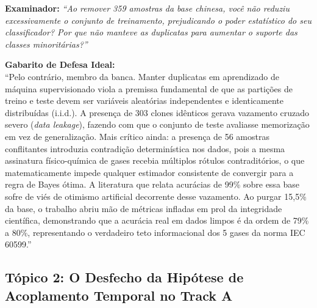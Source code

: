 \documentclass[10pt,a4paper]{article}
\begin{document}
\begin{alertbox}
\textbf{Examinador:} \textit{``Ao remover 359 amostras da base chinesa, você não reduziu excessivamente o conjunto de treinamento, prejudicando o poder estatístico do seu classificador? Por que não manteve as duplicatas para aumentar o suporte das classes minoritárias?''}

\textbf{Gabarito de Defesa Ideal:}\\
``Pelo contrário, membro da banca. Manter duplicatas em aprendizado de máquina supervisionado viola a premissa fundamental de que as partições de treino e teste devem ser variáveis aleatórias independentes e identicamente distribuídas (i.i.d.). 
A presença de 303 clones idênticos gerava vazamento cruzado severo (\textit{data leakage}), fazendo com que o conjunto de teste avaliasse memorização em vez de generalização.
Mais crítico ainda: a presença de 56 amostras conflitantes introduzia contradição determinística nos dados, pois a mesma assinatura físico-química de gases recebia múltiplos rótulos contraditórios, o que matematicamente impede qualquer estimador consistente de convergir para a regra de Bayes ótima.
A literatura que relata acurácias de 99\% sobre essa base sofre de viés de otimismo artificial decorrente desse vazamento. Ao purgar 15,5\% da base, o trabalho abriu mão de métricas infladas em prol da integridade científica, demonstrando que a acurácia real em dados limpos é da ordem de 79\% a 80\%, representando o verdadeiro teto informacional dos 5 gases da norma IEC 60599.''
\end{alertbox}

\subsection{Tópico 2: O Desfecho da Hipótese de Acoplamento Temporal no Track A}
\end{document}
